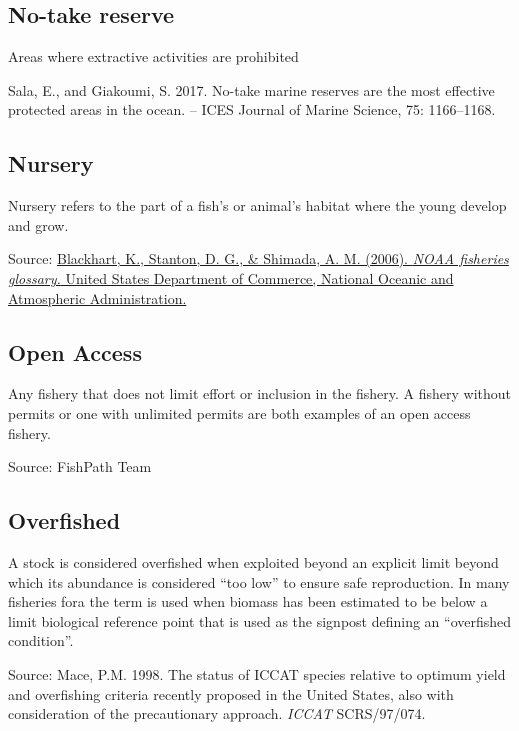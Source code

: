 \documentclass[
  11pt,
]{book}
\begin{document}
\hypertarget{no-take-reserve}{%
\subsection{No-take reserve}\label{no-take-reserve}}

Areas where extractive activities are prohibited

Sala, E., and Giakoumi, S. 2017. No-take marine reserves are the most effective protected areas in the ocean. -- ICES Journal of Marine Science, 75: 1166--1168.

\hypertarget{nursery}{%
\subsection{Nursery}\label{nursery}}

Nursery refers to the part of a fish's or animal's habitat where the young develop and grow.

Source: \href{https://repository.library.noaa.gov/view/noaa/12856}{Blackhart, K., Stanton, D. G., \& Shimada, A. M. (2006). \emph{NOAA fisheries glossary.} United States Department of Commerce, National Oceanic and Atmospheric Administration.}

\hypertarget{open-access}{%
\subsection{Open Access}\label{open-access}}

Any fishery that does not limit effort or inclusion in the fishery. A fishery without permits or one with unlimited permits are both examples of an open access fishery.

Source: FishPath Team

\hypertarget{overfished}{%
\subsection{Overfished}\label{overfished}}

A stock is considered overfished when exploited beyond an explicit limit beyond which its abundance is considered ``too low'' to ensure safe reproduction. In many fisheries fora the term is used when biomass has been estimated to be below a limit biological reference point that is used as the signpost defining an ``overfished condition''.

Source: Mace, P.M. 1998. The status of ICCAT species relative to optimum yield and overfishing criteria recently proposed in the United States, also with consideration of the precautionary approach. \emph{ICCAT} SCRS/97/074.
\end{document}
